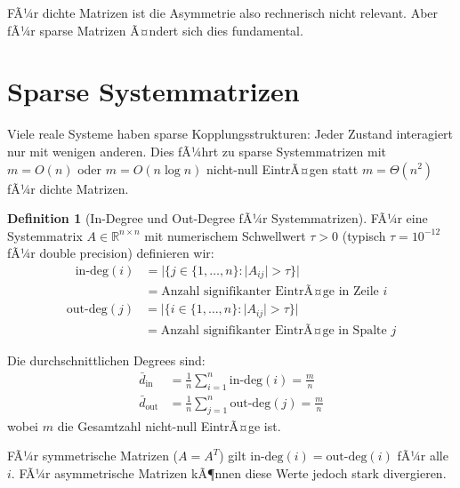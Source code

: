 ﻿\documentclass[a4paper,12pt]{report}
\theoremstyle{definition}
\newtheorem{definition}{Definition}
\begin{document}
	FÃ¼r dichte Matrizen ist die Asymmetrie also rechnerisch nicht relevant. Aber fÃ¼r sparse Matrizen Ã¤ndert sich dies fundamental.
	
	\section{Sparse Systemmatrizen}
	
	Viele reale Systeme haben sparse Kopplungsstrukturen: Jeder Zustand interagiert nur mit wenigen anderen. Dies fÃ¼hrt zu sparse Systemmatrizen mit $m = O(n)$ oder $m = O(n \log n)$ nicht-null EintrÃ¤gen statt $m = \Theta(n^2)$ fÃ¼r dichte Matrizen.
	
	\begin{definition}[In-Degree und Out-Degree fÃ¼r Systemmatrizen]
		FÃ¼r eine Systemmatrix $A \in \mathbb{R}^{n \times n}$ mit numerischem Schwellwert $\tau > 0$ (typisch $\tau = 10^{-12}$ fÃ¼r double precision) definieren wir:
		\begin{align}
			\text{in-deg}(i) &= |\{j \in \{1,\ldots,n\} : |A_{ij}| > \tau\}| \\
			&= \text{Anzahl signifikanter EintrÃ¤ge in Zeile } i
		\end{align}
		\begin{align}
			\text{out-deg}(j) &= |\{i \in \{1,\ldots,n\} : |A_{ij}| > \tau\}| \\
			&= \text{Anzahl signifikanter EintrÃ¤ge in Spalte } j
		\end{align}
		
		Die durchschnittlichen Degrees sind:
		\begin{align}
			\bar{d}_{\text{in}} &= \frac{1}{n} \sum_{i=1}^{n} \text{in-deg}(i) = \frac{m}{n} \\
			\bar{d}_{\text{out}} &= \frac{1}{n} \sum_{j=1}^{n} \text{out-deg}(j) = \frac{m}{n}
		\end{align}
		wobei $m$ die Gesamtzahl nicht-null EintrÃ¤ge ist.
	\end{definition}
	
	FÃ¼r symmetrische Matrizen ($A = A^T$) gilt $\text{in-deg}(i) = \text{out-deg}(i)$ fÃ¼r alle $i$. FÃ¼r asymmetrische Matrizen kÃ¶nnen diese Werte jedoch stark divergieren.
	
\end{document}

